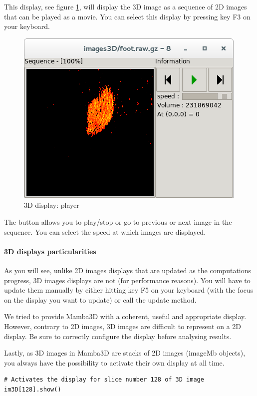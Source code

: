 \documentclass[a4paper,10pt,oneside]{article}
\begin{document}
This display, see figure \ref{fig:dis3D_play}, will display the 3D image
as a sequence of 2D images that can be played as a movie.
You can select this display by pressing key F3 on your keyboard.

\begin{figure}
\centering
\includegraphics[scale=0.5]{images/dis3D_player.png}
\caption{3D display: player}
\label{fig:dis3D_play}
\end{figure}

The button allows you to play/stop or go to previous or next image in the
sequence. You can select the speed at which images are displayed.

\paragraph{3D displays particularities}
As you will see, unlike 2D images displays that are updated as the computations
progress, 3D images displays are not (for performance reasons). You will have
to update them manually by either hitting key F5 on your keyboard (with
the focus on the display you want to update) or call the update method.

We tried to provide Mamba3D with a coherent, useful and appropriate display.
However, contrary to 2D images, 3D images are difficult to represent on a 2D
display. Be sure to correctly configure the display before analysing results.

Lastly, as 3D images in Mamba3D are stacks of 2D images (imageMb objects), you 
always have the possibility to activate their own display at all time.

\lstset{language=Python}
\begin{lstlisting}
# Activates the display for slice number 128 of 3D image
im3D[128].show()
\end{lstlisting}
\end{document}
